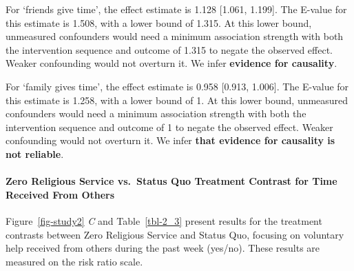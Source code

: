 \documentclass[
  single column]{article}
\let\oldparagraph\paragraph
\renewcommand{\paragraph}[1]{\oldparagraph{#1}\mbox{}}
\begin{document}
For `friends give time', the effect estimate is 1.128 {[}1.061,
1.199{]}. The E-value for this estimate is 1.508, with a lower bound of
1.315. At this lower bound, unmeasured confounders would need a minimum
association strength with both the intervention sequence and outcome of
1.315 to negate the observed effect. Weaker confounding would not
overturn it. We infer \textbf{evidence for causality}.

For `family gives time', the effect estimate is 0.958 {[}0.913,
1.006{]}. The E-value for this estimate is 1.258, with a lower bound of
1. At this lower bound, unmeasured confounders would need a minimum
association strength with both the intervention sequence and outcome of
1 to negate the observed effect. Weaker confounding would not overturn
it. We infer \textbf{that evidence for causality is not reliable}.

\paragraph{Zero Religious Service vs.~Status Quo Treatment Contrast for
Time Received From
Others}\label{zero-religious-service-vs.-status-quo-treatment-contrast-for-time-received-from-others}

Figure~\ref{fig-study2} \emph{C} and Table~\ref{tbl-2_3} present results
for the treatment contrasts between Zero Religious Service and Status
Quo, focusing on voluntary help received from others during the past
week (yes/no). These results are measured on the risk ratio scale.
\end{document}

